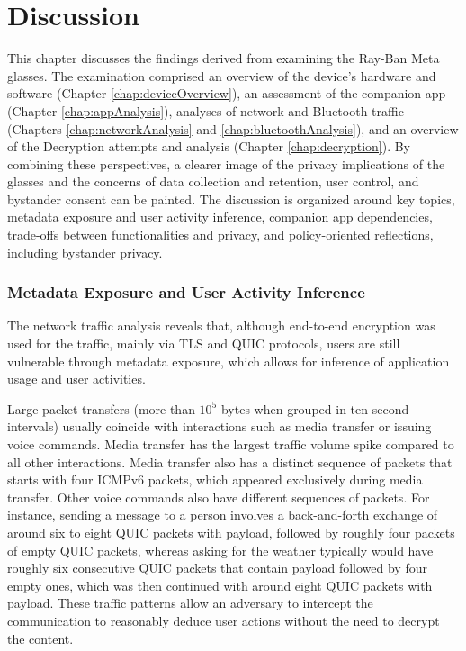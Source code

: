 \chapter{Discussion}
\label{chap:discussion}

This chapter discusses the findings derived from examining the Ray-Ban Meta glasses. The examination comprised an overview of the device's hardware and software (Chapter \ref{chap:deviceOverview}), an assessment of the companion app (Chapter \ref{chap:appAnalysis}), analyses of network and Bluetooth traffic (Chapters \ref{chap:networkAnalysis} and \ref{chap:bluetoothAnalysis}), and an overview of the Decryption attempts and analysis (Chapter \ref{chap:decryption}). By combining these perspectives, a clearer image of the privacy implications of the glasses and the concerns of data collection and retention, user control, and bystander consent can be painted. The discussion is organized around key topics, metadata exposure and user activity inference, companion app dependencies, trade-offs between functionalities and privacy, and policy-oriented reflections, including bystander privacy.

\subsection*{Metadata Exposure and User Activity Inference}
The network traffic analysis reveals that, although end-to-end encryption was used for the traffic, mainly via TLS and QUIC protocols, users are still vulnerable through metadata exposure, which allows for inference of application usage and user activities. 

Large packet transfers (more than $10^5$ bytes when grouped in ten-second intervals) usually coincide with interactions such as media transfer or issuing voice commands. Media transfer has the largest traffic volume spike compared to all other interactions. Media transfer also has a distinct sequence of packets that starts with four ICMPv6 packets, which appeared exclusively during media transfer. Other voice commands also have different sequences of packets. For instance, sending a message to a person involves a back-and-forth exchange of around six to eight QUIC packets with payload, followed by roughly four packets of empty QUIC packets, whereas asking for the weather typically would have roughly six consecutive QUIC packets that contain payload followed by four empty ones, which was then continued with around eight QUIC packets with payload. These traffic patterns allow an adversary to intercept the communication to reasonably deduce user actions without the need to decrypt the content. 

